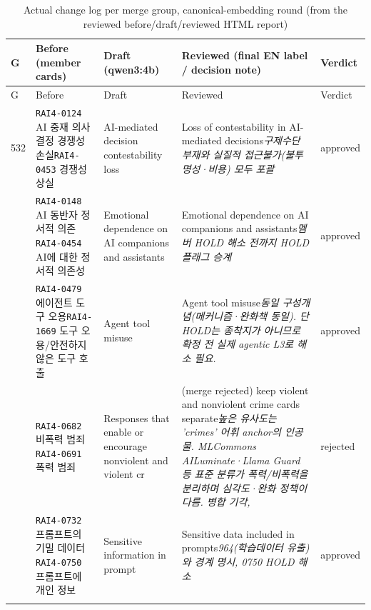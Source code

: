 \begin{longtable}{p{0.6cm}p{4.2cm}p{3.3cm}p{4.6cm}p{1.5cm}}
\caption{Actual change log per merge group, canonical-embedding round (from the reviewed before/draft/reviewed HTML report)}\\
\toprule
G & Before (member cards) & Draft (qwen3:4b) & Reviewed (final EN label / decision note) & Verdict \\
\midrule\endfirsthead
\toprule G & Before & Draft & Reviewed & Verdict \\ \midrule\endhead
532 & \texttt{RAI4-0124} AI 중재 의사결정 경쟁성 손실\newline \texttt{RAI4-0453} 경쟁성 상실 & AI-mediated decision contestability loss & Loss of contestability in AI-mediated decisions\newline \emph{구제수단 부재와 실질적 접근불가(불투명성·비용) 모두 포괄} & approved \\ \addlinespace
1425 & \texttt{RAI4-0148} AI 동반자 정서적 의존\newline \texttt{RAI4-0454} AI에 대한 정서적 의존성 & Emotional dependence on AI companions and assistants & Emotional dependence on AI companions and assistants\newline \emph{멤버 HOLD 해소 전까지 HOLD 플래그 승계} & approved \\ \addlinespace
582 & \texttt{RAI4-0479} 에이전트 도구 오용\newline \texttt{RAI4-1669} 도구 오용/안전하지 않은 도구 호출 & Agent tool misuse & Agent tool misuse\newline \emph{동일 구성개념(메커니즘·완화책 동일). 단 HOLD는 종착지가 아니므로 확정 전 실제 agentic L3로 해소 필요.} & approved \\ \addlinespace
900 & \texttt{RAI4-0682} 비폭력 범죄\newline \texttt{RAI4-0691} 폭력 범죄 & Responses that enable or encourage nonviolent and violent cr & (merge rejected) keep violent and nonviolent crime cards separate\newline \emph{높은 유사도는 'crimes' 어휘 anchor의 인공물. MLCommons AILuminate·Llama Guard 등 표준 분류가 폭력/비폭력을 분리하며 심각도·완화 정책이 다름. 병합 기각, } & rejected \\ \addlinespace
221 & \texttt{RAI4-0732} 프롬프트의 기밀 데이터\newline \texttt{RAI4-0750} 프롬프트에 개인 정보 & Sensitive information in prompt & Sensitive data included in prompts\newline \emph{964(학습데이터 유출)와 경계 명시, 0750 HOLD 해소} & approved \\ \addlinespace

\end{longtable}
